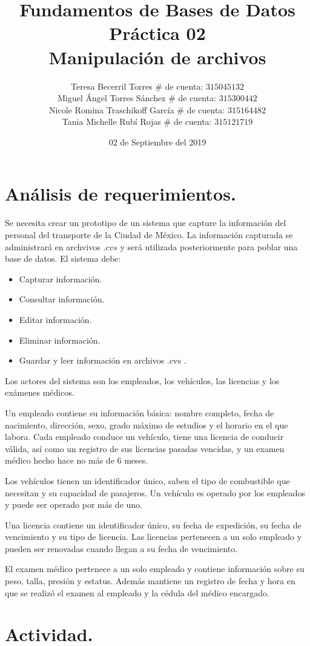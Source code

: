 \documentclass[letterpaper,12pt]{article}
\title{Fundamentos de Bases de Datos \\
       Práctica 02 \\
       Manipulación de archivos}
\author{Teresa Becerril Torres
        $\#$ de cuenta: $315045132$ \\
        Miguel Ángel Torres Sánchez
        $\#$ de cuenta: $315300442$ \\
        Nicole Romina Traschikoff García
        $\#$ de cuenta: $315164482$ \\
        Tania Michelle Rubí Rojas
        $\#$ de cuenta: $315121719$}
\date{02 de Septiembre del 2019}
\begin{document}
\maketitle

\section{Análisis de requerimientos.}

Se necesita crear un prototipo de un sistema que capture la información del 
personal del transporte de la Ciudad de México. La información capturada se 
administrará en archvivos $.cvs$ y será utilizada posteriormente para poblar 
una base de datos. El sistema debe:

\begin{itemize}
    \item Capturar información.
	\item Consultar información.
	\item Editar información.
	\item Eliminar información.
	\item Guardar y leer información en archivos .cvs .
\end{itemize}

Los actores del sistema son los empleados, los vehículos, las licencias y los 
exámenes médicos.

Un empleado contiene su información básica: nombre completo, fecha de 
nacimiento, dirección, sexo, grado máximo de estudios y el horario en el que 
labora. Cada empleado conduce un vehículo, tiene una licencia de conducir 
válida, así como un registro de sus licencias pasadas vencidas, y un examen 
médico hecho hace no más de 6 meses.

Los vehículos tienen un identificador único, saben el tipo de combustible que 
necesitan y su capacidad de pasajeros. Un vehículo es operado por los 
empleados y puede ser operado por más de uno.

Una licencia contiene un identificador único, su fecha de expedición, su fecha 
de vencimiento y su tipo de licencia. Las licencias pertenecen a un solo 
empleado y pueden ser renovadas cuando llegan a su fecha de vencimiento.

El examen médico pertenece a un solo empleado y contiene información sobre 
su peso, talla, presión y estatus. Además mantiene un registro de fecha y 
hora en que se realizó el examen al empleado y la cédula del médico encargado.

\section{Actividad.}
\end{document}
